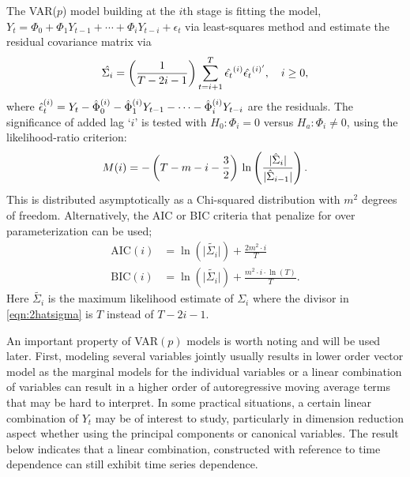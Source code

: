 The VAR($p$) model building at the $i$th stage is fitting the model, $Y_t= \Phi_0 + \Phi_1 Y_{t-1} + \cdots + \Phi_i Y_{t-i} + \epsilon_t$ via least-squares method and estimate the residual covariance matrix via
	\begin{equation} \label{eqn:2hatsigma}
	\hat{\Sigma_i} = \left( \frac{1}{T-2i-1} \right) \sum_{t=i+1}^{T}\Hat{\epsilon_t}^{(i)}{{\hat{\epsilon_t}^{(i)^\prime}}}, \quad i \geq 0,
	\end{equation}
where $ \Hat{\epsilon}_t^{(i)}= Y_t - \Hat{\Phi}_0^{(i)} - \Hat{\Phi}_1^{(i)}Y_{t-1} - \cdots - \Hat{\Phi}_i^{(i)}Y_{t-i}$ are the residuals. The significance of added lag `$i$' is tested with $H_0: \Phi_i= 0$ versus $H_a: \Phi_i \neq 0$, using the likelihood-ratio criterion:
	\begin{equation} \label{eqn:2mi}
	M(i)= -\left(T - m - i - \frac{3}{2}\right)\, \ln\left( \frac{\lvert \Hat{\Sigma}_i \rvert}{\lvert \Hat{\Sigma}_{i-1} \rvert}\right).
	\end{equation}
This is distributed asymptotically as a Chi-squared distribution with $m^2$ degrees of freedom. Alternatively, the AIC or BIC criteria that penalize for over parameterization can be used; 
	\begin{equation} \label{eqn:2aicbic}
	\begin{split}
	\text{AIC}(i)&= \ln\left(\lvert\tilde{\Sigma_i} \rvert \right)+\frac{2m^2 \cdot i}{T} \\
	\text{BIC}(i)&= \ln\left( \lvert \tilde{\Sigma_i} \rvert \right)+\frac{m^2 \cdot i \cdot \ln(T)}{T}.
	\end{split}
	\end{equation}
Here $\tilde{\Sigma_i}$ is the maximum likelihood estimate of $\Sigma_i$ where the divisor in \eqref{eqn:2hatsigma} is $T$ instead of $T - 2i - 1$.


An important property of VAR$(p)$ models is worth noting and will be used later. First, modeling several variables jointly usually results in lower order vector model as the marginal models for the individual variables or a linear combination of variables can result in a higher order of autoregressive moving average terms that may be hard to interpret. In some practical situations, a certain linear combination of $Y_t$ may be of interest to study, particularly in dimension reduction aspect whether using the principal components or canonical variables. The result below indicates that a linear combination, constructed with reference to time dependence can still exhibit time series dependence. 


